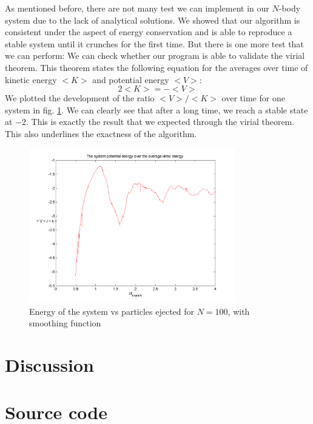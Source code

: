 \documentclass[10pt,a4paper]{article}
\begin{document}
As mentioned before, there are not many test we can implement in our $N$-body system due to the lack of analytical solutions. We showed that our algorithm is consistent under the aspect of energy conservation and is able to reproduce a stable system until it crunches for the first time. But there is one more test that we can perform: We can check whether our program is able to validate the virial theorem. This theorem states the following equation for the averages over time of kinetic energy $<K>$ and potential energy $<V>$:
\begin{equation}
2<K>=-<V>
\end{equation}
We plotted the development of the ratio $<V>/<K>$ over time for one system in fig. \ref{f1}. We can clearly see that after a long time, we reach a stable state at $-2$. This is exactly the result that we expected through the virial theorem. This also underlines the exactness of the algorithm.

\begin{figure}[h]
	\caption{Energy of the system vs particles ejected for $N=100$, with smoothing function\label{f1}}
	\includegraphics[width=0.8\textwidth]{f1.png}
\end{figure}

\section{Discussion}

\section{Source code}
\end{document}
